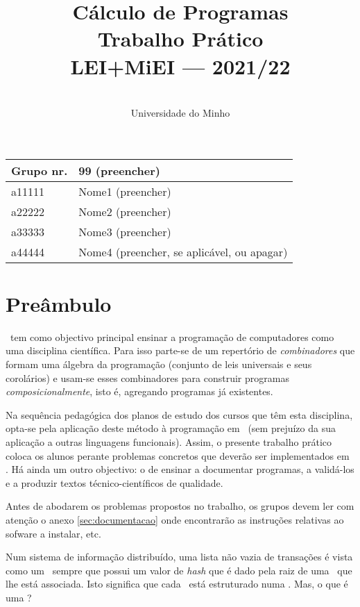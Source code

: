 \documentclass[a4paper]{article}
\title{
          Cálculo de Programas
\\
          Trabalho Prático
\\
          LEI+MiEI --- 2021/22
}
\author{
          \dium
\\
          Universidade do Minho
}
\date\mydate
\begin{document}
\maketitle

\begin{center}\large
\begin{tabular}{ll}
\textbf{Grupo} nr. & 99 (preencher)
\\\hline
a11111 & Nome1 (preencher)
\\
a22222 & Nome2 (preencher)
\\
a33333 & Nome3 (preencher)
\\
a44444 & Nome4 (preencher, se aplicável, ou apagar)
\end{tabular}
\end{center}

\section{Preâmbulo}

\CP\ tem como objectivo principal ensinar
a progra\-mação de computadores como uma disciplina científica. Para isso
parte-se de um repertório de \emph{combinadores} que formam uma álgebra da
programação (conjunto de leis universais e seus corolários) e usam-se esses
combinadores para construir programas \emph{composicionalmente}, isto é,
agregando programas já existentes.

Na sequência pedagógica dos planos de estudo dos cursos que têm
esta disciplina, opta-se pela aplicação deste método à programação
em \Haskell\ (sem prejuízo da sua aplicação a outras linguagens
funcionais). Assim, o presente trabalho prático coloca os
alunos perante problemas concretos que deverão ser implementados em
\Haskell.  Há ainda um outro objectivo: o de ensinar a documentar
programas, a validá-los e a produzir textos técnico-científicos de
qualidade.

Antes de abodarem os problemas propostos no trabalho, os grupos devem ler
com atenção o anexo \ref{sec:documentacao} onde encontrarão as instruções
relativas ao sofware a instalar, etc.


\Problema

Num sistema de informação distribuído, uma lista não vazia de transações
é vista como um \textit\blockchain\ sempre que possui um valor de \textit{hash}
que é dado pela raiz de uma \MerkleTree\ que lhe está associada. Isto significa
que cada \textit\blockchain\ está estruturado numa \MerkleTree.
Mas, o que é uma \MerkleTree?
\end{document}
